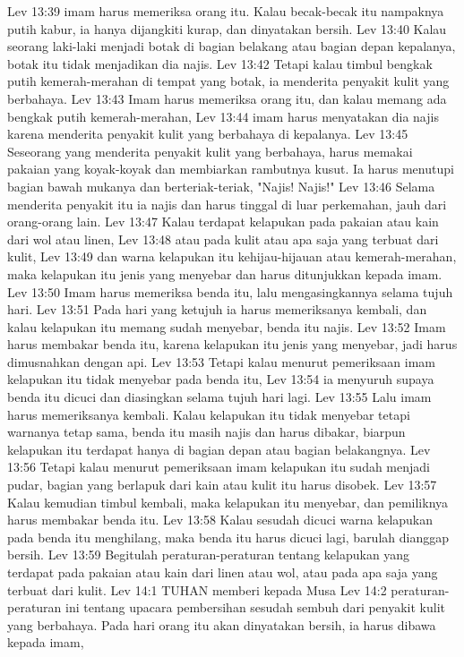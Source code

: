 Lev 13:39  imam harus memeriksa orang itu. Kalau becak-becak itu nampaknya putih kabur, ia hanya dijangkiti kurap, dan dinyatakan bersih.
Lev 13:40  Kalau seorang laki-laki menjadi botak di bagian belakang atau bagian depan kepalanya, botak itu tidak menjadikan dia najis.
Lev 13:42  Tetapi kalau timbul bengkak putih kemerah-merahan di tempat yang botak, ia menderita penyakit kulit yang berbahaya.
Lev 13:43  Imam harus memeriksa orang itu, dan kalau memang ada bengkak putih kemerah-merahan,
Lev 13:44  imam harus menyatakan dia najis karena menderita penyakit kulit yang berbahaya di kepalanya.
Lev 13:45  Seseorang yang menderita penyakit kulit yang berbahaya, harus memakai pakaian yang koyak-koyak dan membiarkan rambutnya kusut. Ia harus menutupi bagian bawah mukanya dan berteriak-teriak, "Najis! Najis!"
Lev 13:46  Selama menderita penyakit itu ia najis dan harus tinggal di luar perkemahan, jauh dari orang-orang lain.
Lev 13:47  Kalau terdapat kelapukan pada pakaian atau kain dari wol atau linen,
Lev 13:48  atau pada kulit atau apa saja yang terbuat dari kulit,
Lev 13:49  dan warna kelapukan itu kehijau-hijauan atau kemerah-merahan, maka kelapukan itu jenis yang menyebar dan harus ditunjukkan kepada imam.
Lev 13:50  Imam harus memeriksa benda itu, lalu mengasingkannya selama tujuh hari.
Lev 13:51  Pada hari yang ketujuh ia harus memeriksanya kembali, dan kalau kelapukan itu memang sudah menyebar, benda itu najis.
Lev 13:52  Imam harus membakar benda itu, karena kelapukan itu jenis yang menyebar, jadi harus dimusnahkan dengan api.
Lev 13:53  Tetapi kalau menurut pemeriksaan imam kelapukan itu tidak menyebar pada benda itu,
Lev 13:54  ia menyuruh supaya benda itu dicuci dan diasingkan selama tujuh hari lagi.
Lev 13:55  Lalu imam harus memeriksanya kembali. Kalau kelapukan itu tidak menyebar tetapi warnanya tetap sama, benda itu masih najis dan harus dibakar, biarpun kelapukan itu terdapat hanya di bagian depan atau bagian belakangnya.
Lev 13:56  Tetapi kalau menurut pemeriksaan imam kelapukan itu sudah menjadi pudar, bagian yang berlapuk dari kain atau kulit itu harus disobek.
Lev 13:57  Kalau kemudian timbul kembali, maka kelapukan itu menyebar, dan pemiliknya harus membakar benda itu.
Lev 13:58  Kalau sesudah dicuci warna kelapukan pada benda itu menghilang, maka benda itu harus dicuci lagi, barulah dianggap bersih.
Lev 13:59  Begitulah peraturan-peraturan tentang kelapukan yang terdapat pada pakaian atau kain dari linen atau wol, atau pada apa saja yang terbuat dari kulit.
Lev 14:1  TUHAN memberi kepada Musa
Lev 14:2  peraturan-peraturan ini tentang upacara pembersihan sesudah sembuh dari penyakit kulit yang berbahaya. Pada hari orang itu akan dinyatakan bersih, ia harus dibawa kepada imam,
